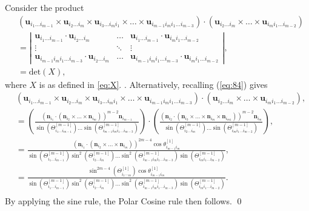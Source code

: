 \documentclass[fleqn,11pt,twoside]{article}
\makeatletter
\renewenvironment{proof}[1][\proofname]{\par
  \normalfont
  \topsep6\p@\@plus6\p@ \trivlist
  \item[\hskip\labelsep\textbf{%
    #1\@addpunct{.}}]\ignorespaces
}{%
  \qed\endtrivlist
}
\theoremstyle{definition}
\makeatother
\begin{document}
\begin{proof}
Consider the product
\begin{equation}
\begin{split}
&(\mathbf{u}_{i_{1}\dots i_{m-1}}\times\mathbf{u}_{i_{2}\dots i_{m}}\times\mathbf{u}_{i_{3}\dots i_{m}i_1}\times\dots\times\mathbf{u}_{i_{m-1}i_mi_1\dots i_{m-3}})\cdot (\mathbf{u}_{i_{2}\dots i_{m}}\times\dots\times\mathbf{u}_{i_{m}i_1\dots i_{m-2}})\\
&=\left|\begin{array}{ccc}
\mathbf{u}_{i_{1}\dots i_{m-1}}\cdot\mathbf{u}_{i_{2}\dots i_{m}} & \dots & \mathbf{u}_{i_{1}\dots i_{m-1}}\cdot\mathbf{u}_{i_mi_{1}\dots i_{m-2}}\\
\vdots&\ddots&\vdots\\
\mathbf{u}_{i_{m-1}i_mi_1\dots i_{m-3}}\cdot\mathbf{u}_{i_{2}\dots i_{m}} & \dots & \mathbf{u}_{i_{m-1}i_mi_1\dots i_{m-3}}\cdot\mathbf{u}_{i_{m}i_1\dots i_{m-2}}
\end{array}\right|,\\
&=\mathrm{det}(X),
\end{split}
\end{equation}
where $X$ is as defined in \eqref{eq:X}. .
Alternatively, recalling (\ref{eq:84}) gives
\begin{equation}
\begin{split}
&(\mathbf{u}_{i_{1}\dots i_{m-1}}\times\mathbf{u}_{i_{2}\dots i_{m}}\times\mathbf{u}_{i_{3}\dots i_{m}i_1}\times\dots\times\mathbf{u}_{i_{m-1}i_mi_1\dots i_{m-3}})\cdot (\mathbf{u}_{i_{2}\dots i_{m}}\times\dots\times\mathbf{u}_{i_{m}i_1\dots i_{m-2}}),\\
&=\left(\frac{(\mathbf{n}_{i_{1}}\cdot(\mathbf{n}_{i_{2}}\times\dots\times\mathbf{n}_{i_{m}}))^{m-2}\mathbf{n}_{i_{m-1}}}{\sin\left(\Theta^{[m-1]}_{i_1\dots i_{m-1}}\right)\dots\sin\left(\Theta^{[m-1]}_{i_{m-1}i_mi_1\dots i_{m-3}}\right)}\right)\cdot\left(\frac{(\mathbf{n}_{i_{2}}\cdot(\mathbf{n}_{i_{3}}\times\dots\times\mathbf{n}_{i_{m}}\times\mathbf{n}_{i_{m1}}))^{m-2}\mathbf{n}_{i_{m}}}{\sin\left(\Theta^{[m-1]}_{i_2\dots i_{m}}\right)\dots\sin\left(\Theta^{[m-1]}_{i_{m}i_1\dots i_{m-2}}\right)}\right),\\
&=\frac{(\mathbf{n}_{i_{1}}\cdot(\mathbf{n}_{i_{2}}\times\dots\times\mathbf{n}_{i_{m}}))^{2m-4}\cos\theta^{[1]}_{i_{m-1}i_m}}{\sin(\Theta^{[m-1]}_{i_1\dots i_{m-1}})\sin^2\left(\Theta^{[m-1]}_{i_2\dots i_{m}}\right)\dots\sin^2\left(\Theta^{[m-1]}_{i_{m-1}i_mi_1\dots i_{m-3}}\right)\sin\left(\Theta^{[m-1]}_{i_mi_1\dots i_{m-2}}\right)},\\
&=\frac{\sin^{2m-4}(\Theta^{[1]}_{i_1\dotsi_m})\cos\theta^{[1]}_{i_{m-1}i_m}}{\sin(\Theta^{[m-1]}_{i_1\dots i_{m-1}})\sin^2\left(\Theta^{[m-1]}_{i_2\dots i_{m}}\right)\dots\sin^2\left(\Theta^{[m-1]}_{i_{m-1}i_mi_1\dots i_{m-3}}\right)\sin\left(\Theta^{[m-1]}_{i_mi_1\dots i_{m-2}}\right)}.\\
\end{split}
\end{equation}
By applying the sine rule, the Polar Cosine rule then follows.
\end{proof}
\end{document}
